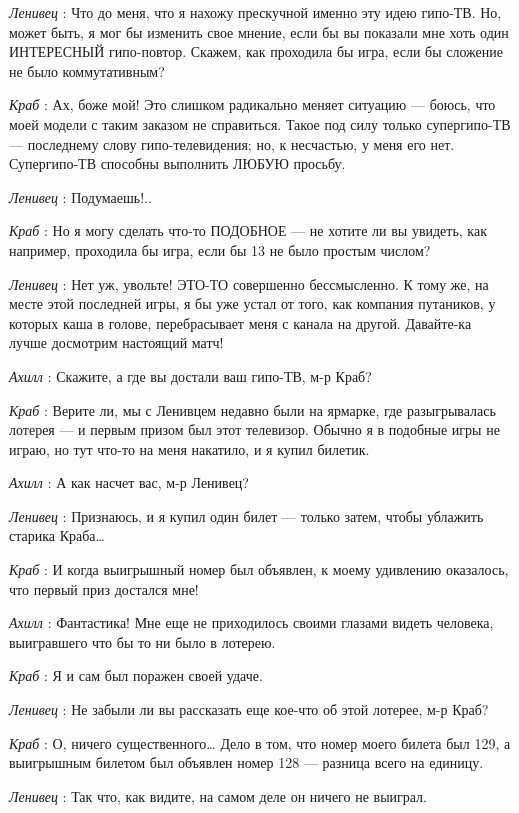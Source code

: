 \documentclass[../main.tex]{subfiles}
\begin{document}
\begin{dialogue}
\emph{Ленивец} : Что до меня, что я нахожу прескучной именно эту идею гипо-ТВ. Но, может быть, я мог бы изменить свое мнение, если бы вы показали мне хоть один ИНТЕРЕСНЫЙ гипо-повтор. Скажем, как проходила бы игра, если бы сложение не было коммутативным?

\emph{Краб} : Ах, боже мой! Это слишком радикально меняет ситуацию --- боюсь, что моей модели с таким заказом не справиться. Такое под силу только супергипо-ТВ --- последнему слову гипо-телевидения; но, к несчастью, у меня его нет. Супергипо-ТВ способны выполнить ЛЮБУЮ просьбу.

\emph{Ленивец} : Подумаешь!..

\emph{Краб} : Но я могу сделать что-то ПОДОБНОЕ --- не хотите ли вы увидеть, как например, проходила бы игра, если бы 13 не было простым числом?

\emph{Ленивец} : Нет уж, увольте! ЭТО-ТО совершенно бессмысленно. К тому же, на месте этой последней игры, я бы уже устал от того, как компания путаников, у которых каша в голове, перебрасывает меня с канала на другой. Давайте-ка лучше досмотрим настоящий матч!

\emph{Ахилл} : Скажите, а где вы достали ваш гипо-ТВ, м-р Краб?

\emph{Краб} : Верите ли, мы с Ленивцем недавно были на ярмарке, где разыгрывалась лотерея --- и первым призом был этот телевизор. Обычно я в подобные игры не играю, но тут что-то на меня накатило, и я купил билетик.

\emph{Ахилл} : А как насчет вас, м-р Ленивец?

\emph{Ленивец} : Признаюсь, и я купил один билет --- только затем, чтобы ублажить старика Краба\ldots{}

\emph{Краб} : И когда выигрышный номер был объявлен, к моему удивлению оказалось, что первый приз достался мне!

\emph{Ахилл} : Фантастика! Мне еще не приходилось своими глазами видеть человека, выигравшего что бы то ни было в лотерею.

\emph{Краб} : Я и сам был поражен своей удаче.

\emph{Ленивец} : Не забыли ли вы рассказать еще кое-что об этой лотерее, м-р Краб?

\emph{Краб} : О, ничего существенного\ldots{} Дело в том, что номер моего билета был 129, а выигрышным билетом был объявлен номер 128 --- разница всего на единицу.

\emph{Ленивец} : Так что, как видите, на самом деле он ничего не выиграл.


\end{dialogue}
\end{document}
